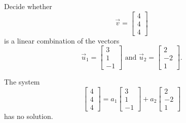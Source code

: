 \documentclass{ximera}
\begin{document}
\begin{problem}\label{prb:3.4}
Decide whether
\begin{equation*}
\vec{v}= 
\begin{bmatrix}
4 \\
4 \\
4
\end{bmatrix}
\end{equation*}
is a linear combination of the vectors
\begin{equation*}
\vec{u}_1 = 
\begin{bmatrix}
3 \\
1 \\
-1
\end{bmatrix}
\mbox{ and  }
\vec{u}_2 =
\begin{bmatrix}
2 \\
-2\\
1
\end{bmatrix}.
\end{equation*}

\begin{hint}
The system
\begin{equation*}
\left[
\begin{array}{r}
4 \\
4 \\
4
\end{array}
\right]
=
a_1
\left[
\begin{array}{r}
3 \\
1 \\
-1
\end{array}
\right]
+a_2
\left[
\begin{array}{r}
2 \\
-2\\
1
\end{array}
\right]
\end{equation*}
has no solution.
\end{hint}
\end{problem}
\end{document}
